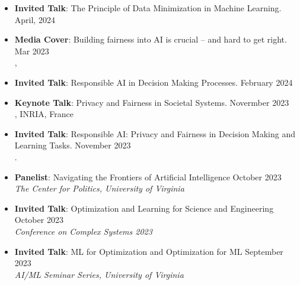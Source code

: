 
\vspace{6pt}
\begin{itemize}
  \item {\bf Invited Talk}: The Principle of Data Minimization in Machine Learning. \hfill{April, 2024}\\
  {}

  \item {\bf Media Cover}: 
  {Building fairness into AI is crucial – and hard to get right.} \hfill {Mar 2023} \\
  , 

  \item {\bf Invited Talk}: Responsible AI in Decision Making Processes. \hfill{February 2024}\\
  {}
  
  \item {\bf Keynote Talk}: {Privacy and Fairness in Societal Systems.} \hfill{Novermber 2023}\\
  {, INRIA, France}

  \item {\bf Invited Talk}: {Responsible AI: Privacy and Fairness in Decision Making and Learning Tasks.} \hfill{November 2023}\\
  {.}

  \item {\bf Panelist}: {Navigating the Frontiers of Artificial Intelligence} \hfill{October 2023}\\
  {\em  The Center for Politics, University of Virginia}

  \item {\bf Invited Talk}: {Optimization and Learning for Science and Engineering} \hfill{October 2023}\\
  {\em  Conference on Complex Systems 2023}

  \item {\bf Invited Talk}: {ML for Optimization and Optimization for ML} \hfill{September 2023}\\
  {\em  AI/ML Seminar Series, University of Virginia}


\end{itemize}
